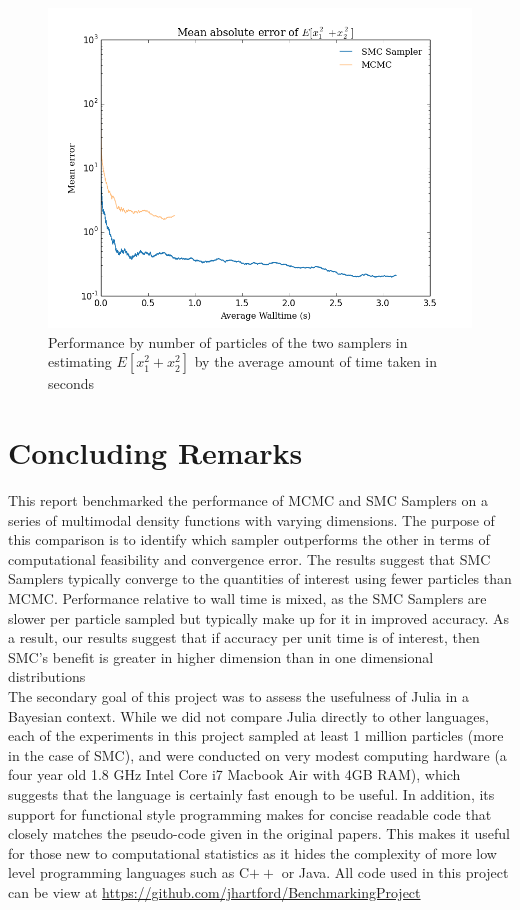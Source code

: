 \documentclass[12pt]{elsarticle}
\begin{document}
\begin{figure}[htbp]
\begin{center}
\includegraphics[width = \textwidth]{plots/2d-errors_walltime.png}
\caption{Performance by number of particles of the two samplers in estimating $E[x_1^2 + x_2^2]$ by the average amount of time taken in seconds}
\label{multi_walltime}
\end{center}
\end{figure}




\section*{Concluding Remarks}
This report benchmarked the performance of MCMC and SMC Samplers on a series of multimodal density functions with varying dimensions. The purpose of this comparison is to identify which sampler outperforms the other in terms of computational feasibility and convergence error. The results suggest that SMC Samplers typically converge to the quantities of interest using fewer particles than MCMC. Performance relative to wall time is mixed, as the SMC Samplers are slower per particle sampled but typically make up for it in improved accuracy. As a result, our results suggest that if accuracy per unit time is of interest, then SMC's benefit is greater in higher dimension than in one dimensional distributions\\

The secondary goal of this project was to assess the usefulness of Julia in a Bayesian context. While we did not compare Julia directly to other languages, each of the experiments in this project sampled at least 1 million particles (more in the case of SMC), and were conducted on very modest computing hardware (a four year old 1.8 GHz Intel Core i7 Macbook Air with 4GB RAM), which suggests that the language is certainly fast enough to be useful. In addition, its support for functional style programming makes for concise readable code that closely matches the pseudo-code given in the original papers. This makes it useful for those new to computational statistics as it hides the complexity of more low level programming languages such as C$++$ or Java. All code used in this project can be view at \url{https://github.com/jhartford/BenchmarkingProject}
\end{document}

